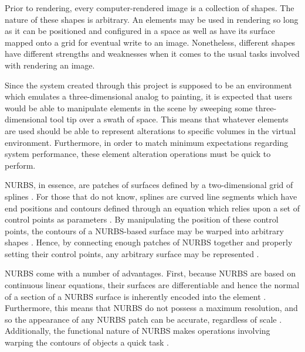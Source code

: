 \documentclass[onecolumn, draftclsnofoot,10pt, compsoc]{IEEEtran}
\newcounter{threesection}[subsubsection]
\begin{document}
Prior to rendering, every computer-rendered image is a collection of shapes.
The nature of these shapes is arbitrary.
An elements may be used in rendering so long as it can be positioned and configured in a space as well as have its surface mapped onto a grid for eventual write to an image.
Nonetheless, different shapes have different strengths and weaknesses when it comes to the usual tasks involved with rendering an image.


Since the system created through this project is supposed to be an environment which emulates a three-dimensional analog to painting, it is expected that users would be able to manipulate elements in the scene by sweeping some three-dimensional tool tip over a swath of space. This means that whatever elements are used should be able to represent alterations to specific volumes in the virtual environment. Furthermore, in order to match minimum expectations regarding system performance, these element alteration operations must be quick to perform.


NURBS, in essence, are patches of surfaces defined by a two-dimensional grid of splines \cite{braxTech1}\cite{braxTech2}.
For those that do not know, splines are curved line segments which have end positions and contours defined through an equation which relies upon a set of control points as parameters \cite{braxTech1}\cite{braxTech2}.
By manipulating the position of these control points, the contours of a NURBS-based surface may be warped into arbitrary shapes \cite{braxTech1}\cite{braxTech2}.
Hence, by connecting enough patches of NURBS together and properly setting their control points, any arbitrary surface may be represented \cite{braxTech1}\cite{braxTech2}.

NURBS come with a number of advantages.
First, because NURBS are based on continuous linear equations, their surfaces are differentiable and hence the normal of a section of a NURBS surface is inherently encoded into the element \cite{braxTech2}.
Furthermore, this means that NURBS do not possess a maximum resolution, and so the appearance of any NURBS patch can be accurate, regardless of scale \cite{braxTech2}.
Additionally, the functional nature of NURBS makes operations involving warping the contours of objects a quick task \cite{braxTech2}.
\end{document}

